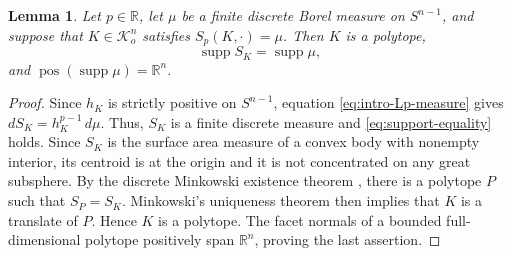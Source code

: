 \documentclass[12pt,reqno]{amsart}
\numberwithin{equation}{section}
\newtheorem{lemma}[theorem]{Lemma}
\theoremstyle{remark}
\DeclareMathOperator{\pos}{pos}
\DeclareMathOperator{\supp}{supp}
\newcommand{\R}{\mathbb R}
\newcommand{\Koo}{\mathcal K_o^n}
\begin{document}
\begin{lemma}\label{lem:discrete-solution-polytope}
Let $p\in\R$, let $\mu$ be a finite discrete Borel measure on $S^{n-1}$, and suppose that $K\in\Koo$ satisfies $S_p(K,\cdot)=\mu$. Then $K$ is a polytope,
\begin{equation}\label{eq:support-equality}
 \supp S_K=\supp\mu,
\end{equation}
and $\pos(\supp\mu)=\R^n$.
\end{lemma}

\begin{proof}
Since $h_K$ is strictly positive on $S^{n-1}$, equation \eqref{eq:intro-Lp-measure} gives $dS_K=h_K^{p-1}\,d\mu$. Thus, $S_K$ is a finite discrete measure and \eqref{eq:support-equality} holds. Since $S_K$ is the surface area measure of a convex body with nonempty interior, its centroid is at the origin and it is not concentrated on any great subsphere. By the discrete Minkowski existence theorem \cite[Theorem~8.2.1]{Schneider}, there is a polytope $P$ such that $S_P=S_K$. Minkowski's uniqueness theorem \cite[Theorem~8.1.1]{Schneider} then implies that $K$ is a translate of $P$. Hence $K$ is a polytope. The facet normals of a bounded full-dimensional polytope positively span $\R^n$, proving the last assertion.
\end{proof}
\end{document}
